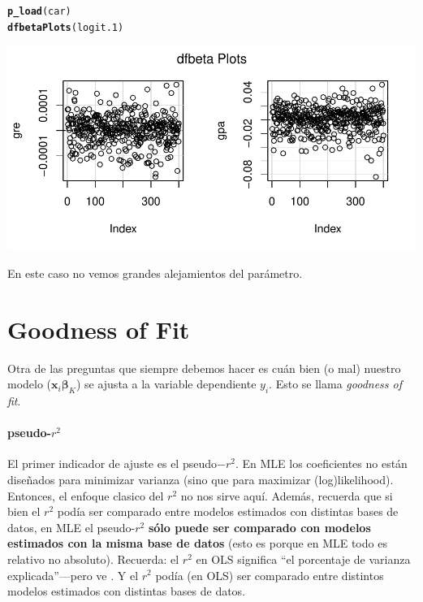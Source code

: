 \documentclass[onesided]{article}\usepackage[]{graphicx}\usepackage[]{color}
\makeatletter
\def\maxwidth{ %
  \ifdim\Gin@nat@width>\linewidth
    \linewidth
  \else
    \Gin@nat@width
  \fi
}
\newcommand{\hlstd}[1]{\textcolor[rgb]{0.345,0.345,0.345}{#1}}%
\newcommand{\hlkwd}[1]{\textcolor[rgb]{0.737,0.353,0.396}{\textbf{#1}}}%
\newenvironment{kframe}{%
 \def\at@end@of@kframe{}%
 \ifinner\ifhmode%
  \def\at@end@of@kframe{\end{minipage}}%
  \begin{minipage}{\columnwidth}%
 \fi\fi%
 \def\FrameCommand##1{\hskip\@totalleftmargin \hskip-\fboxsep
 \colorbox{shadecolor}{##1}\hskip-\fboxsep
     \hskip-\linewidth \hskip-\@totalleftmargin \hskip\columnwidth}%
 \MakeFramed {\advance\hsize-\width
   \@totalleftmargin\z@ \linewidth\hsize
   \@setminipage}}%
 {\par\unskip\endMakeFramed%
 \at@end@of@kframe}
\newenvironment{knitrout}{}{} %
\makeatother
\begin{document}
\begin{knitrout}
\color{fgcolor}\begin{kframe}
\begin{alltt}
\hlkwd{p_load}\hlstd{(car)}
\hlkwd{dfbetaPlots}\hlstd{(logit.1)}
\end{alltt}
\end{kframe}

{\centering \includegraphics[width=\maxwidth]{figure/DFBETAS:p-1} 

}



\end{knitrout}

En este caso no vemos grandes alejamientos del par\'ametro.

\section{Goodness of Fit}

Otra de las preguntas que siempre debemos hacer es cu\'an bien (o mal) nuestro modelo ($\bm{x}_{i}\bm{\beta}_{K}$) se ajusta a la variable dependiente $y_{i}$. Esto se llama \emph{goodness of fit}.

\paragraph{pseudo-$r^{2}$} El primer indicador de ajuste es el pseudo$-r^{2}$. En MLE los coeficientes no est\'an dise\~nados para minimizar varianza (sino que para maximizar (log)likelihood). Entonces, el enfoque clasico del $r^{2}$ no nos sirve aqu\'i. Adem\'as, recuerda que si bien el $r^2$ pod\'ia ser comparado entre modelos estimados con distintas bases de datos, en MLE el pseudo-$r^{2}$ {\bf s\'olo puede ser comparado con modelos estimados con la misma base de datos} (esto es porque en MLE todo es relativo no absoluto). Recuerda: el $r^{2}$ en OLS significa ``el porcentaje de varianza explicada''---pero ve \textcite{King1986}. Y el $r^{2}$ pod\'ia (en OLS) ser comparado entre distintos modelos estimados con distintas bases de datos.
\end{document}
